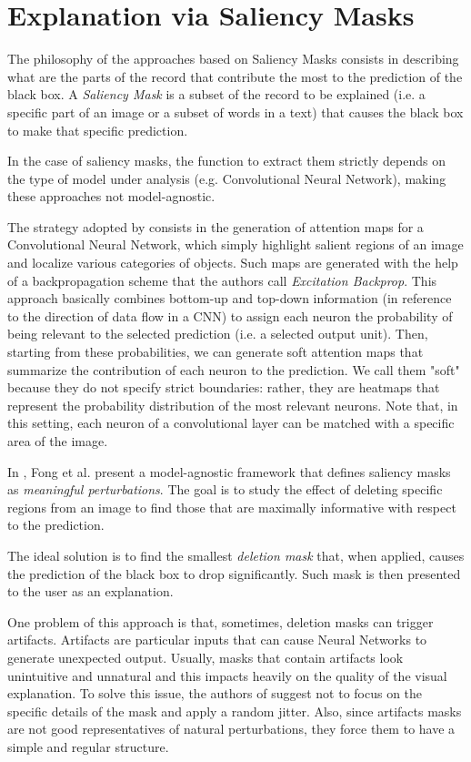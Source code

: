 \documentclass[12pt, twoside, a4paper]{report}
\begin{document}
\section{Explanation via Saliency Masks}

The philosophy of the approaches based on Saliency Masks consists in describing what are the parts of the record that contribute the most to the prediction of the black box. A \textit{Saliency Mask} is a subset of the record to be explained (i.e. a specific part of an image or a subset of words in a text) that causes the black box to make that specific prediction. 

In the case of saliency masks, the function to extract them strictly depends on the type of model under analysis (e.g. Convolutional Neural Network), making these approaches not model-agnostic.
\bigskip

The strategy adopted by \cite{neural-attention} consists in the generation of attention maps for a Convolutional Neural Network, which simply highlight salient regions of an image and localize various categories of objects. Such maps are generated with the help of a backpropagation scheme that the authors call \textit{Excitation Backprop}. This approach basically combines bottom-up and top-down information (in reference to the direction of data flow in a CNN) to assign each neuron the probability of being relevant to the selected prediction (i.e. a selected output unit). Then, starting from these probabilities, we can generate soft attention maps that summarize the contribution of each neuron to the prediction. We call them "soft" because they do not specify strict boundaries: rather, they are heatmaps that represent the probability distribution of the most relevant neurons.
Note that, in this setting, each neuron of a convolutional layer can be matched with a specific area of the image.
\bigskip 

In \cite{fong}, Fong et al. present a model-agnostic framework that defines saliency masks as \textit{meaningful perturbations}. The goal is to study the effect of deleting specific regions from an image to find those that are maximally informative with respect to the prediction.

The ideal solution is to find the smallest \textit{deletion mask} that, when applied, causes the prediction of the black box to drop significantly. Such mask is then presented to the user as an explanation.

One problem of this approach is that, sometimes, deletion masks can trigger artifacts. Artifacts are particular inputs that can cause Neural Networks to generate unexpected output. Usually, masks that contain artifacts look unintuitive and unnatural and this impacts heavily on the quality of the visual explanation. 
To solve this issue, the authors of \cite{fong} suggest not to focus on the specific details of the mask and apply a random jitter. Also, since artifacts masks are not good representatives of natural perturbations, they force them to have a simple and regular structure.
\bigskip
\end{document}
